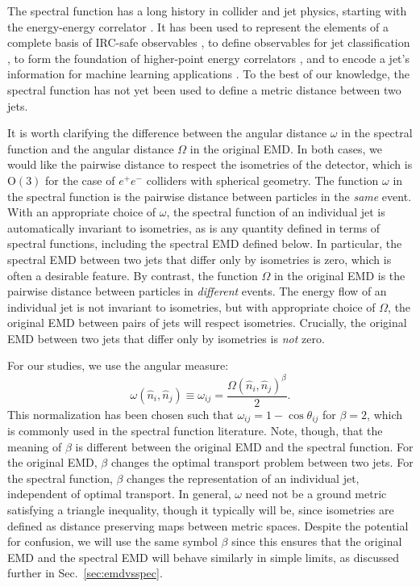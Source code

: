 \documentclass[letterpaper,11pt]{article}
\DeclareRobustCommand{\Sec}[1]{Sec.~\ref{#1}}
\begin{document}
The spectral function has a long history in collider and jet physics, starting with the energy-energy correlator \cite{Basham:1978bw}.
%
It has been used to represent the elements of a complete basis of IRC-safe observables \cite{Tkachov:1995kk}, to define observables for jet classification \cite{Jankowiak:2011qa}, to form the foundation of higher-point energy correlators \cite{Chen:2020vvp}, and to encode a jet's information for machine learning applications \cite{Chakraborty:2019imr}.
%
To the best of our knowledge, the spectral function has not yet been used to define a metric distance between two jets.


It is worth clarifying the difference between the angular distance $\omega$ in the spectral function and the angular distance $\Omega$ in the original EMD.
%
In both cases, we would like the pairwise distance to respect the isometries of the detector, which is $\text{O}(3)$ for the case of $e^+e^-$ colliders with spherical geometry.
%
The function $\omega$ in the spectral function is the pairwise distance between particles in the \emph{same} event.
%
With an appropriate choice of $\omega$, the spectral function of an individual jet is automatically invariant to isometries, as is any quantity defined in terms of spectral functions, including the spectral EMD defined below.
%
In particular, the spectral EMD between two jets that differ only by isometries is zero, which is often a desirable feature.
%
By contrast, the function $\Omega$ in the original EMD is the pairwise distance between particles in \emph{different} events.
%
The energy flow of an individual jet is not invariant to isometries, but with appropriate choice of $\Omega$, the original EMD between pairs of jets will respect isometries.
%
Crucially, the original EMD between two jets that differ only by isometries is \emph{not} zero.


For our studies, we use the angular measure:
%
\begin{equation}
\label{eq:lower_omega}
\omega(\hat{n}_i,\hat{n}_j) \equiv \omega_{ij} = \frac{\Omega(\hat{n}_i,\hat{n}_j)^\beta}{2}.
\end{equation}
%
This normalization has been chosen such that $\omega_{ij} = 1 - \cos \theta_{ij}$ for $\beta = 2$, which is commonly used in the spectral function literature.
%
Note, though, that the meaning of $\beta$ is different between the original EMD and the spectral function.
%
For the original EMD, $\beta$ changes the optimal transport problem between two jets.
%
For the spectral function, $\beta$ changes the representation of an individual jet, independent of optimal transport.
%
In general, $\omega$ need not be a ground metric satisfying a triangle inequality, though it typically will be, since isometries are defined as distance preserving maps between metric spaces.
%
Despite the potential for confusion, we will use the same symbol $\beta$ since this ensures that the original EMD and the spectral EMD will behave similarly in simple limits, as discussed further in \Sec{sec:emdvsspec}.
\end{document}

